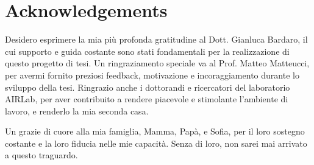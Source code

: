 \documentclass{headers/polimi_3i}
\begin{document}
\mainmatter %









\thispagestyle{empty}
\cleardoublepage

\setlength{}
\printbibliography



\cleardoublepage

\listoffigures

\listoftables

\listofalgorithms

\chapter*{Acknowledgements}
Desidero esprimere la mia più profonda gratitudine al Dott. Gianluca Bardaro, il cui supporto e guida costante sono
stati fondamentali per la realizzazione di questo progetto di tesi. Un ringraziamento speciale va al Prof. Matteo Matteucci, per 
avermi fornito preziosi feedback, motivazione e incoraggiamento durante lo sviluppo della tesi.
Ringrazio anche i dottorandi e ricercatori del laboratorio AIRLab, per aver contribuito a rendere piacevole e stimolante
l'ambiente di lavoro, e renderlo la mia seconda casa.

Un grazie di cuore alla mia famiglia, Mamma, Papà, e Sofia, per il loro sostegno costante e la loro fiducia nelle mie capacità. 
Senza di loro, non sarei mai arrivato a questo traguardo.
\end{document}

